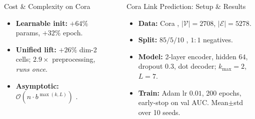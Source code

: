 \documentclass[final]{beamer}
\newlength{\sepwidth}
\newlength{\colwidth}
\newcommand{\separatorcolumn}{
  \begin{column}{\sepwidth}
\end{column}}
\begin{document}
\begin{frame}[t]
\begin{columns}[t]
\begin{column}{\colwidth}
\begin{block}{Cost \& Complexity on Cora}
        \medskip
        \raggedright
      \begin{itemize}\setlength{\itemsep}{0.12em}
          \item \textbf{Learnable init:} $+64\%$ params, $+32\%$ epoch.
          \item \textbf{Unified lift:} $+26\%$ dim-2 cells; $2.9{\times}$
            preprocessing, \emph{runs once}.
          \item \textbf{Asymptotic:}
            $\mathcal O(n\!\cdot\!b^{\max(k,L)})$
            \citep{truong_weisfeiler_2024}.
        \end{itemize}

      \end{block}

    \end{column}

    \separatorcolumn

    \begin{column}{\colwidth}

      \begin{block}{Cora Link Prediction: Setup \& Results}

      \begin{itemize}\setlength{\itemsep}{0.18em}
          \item \textbf{Data:} Cora \citep{sen_collective_2008}, $|\mathcal V|{=}2708$, $|\mathcal E|{=}5278$.
          \item \textbf{Split:} $85/5/10$ \citep{kipf_variational_2016}, $1{:}1$ negatives.
          \item \textbf{Model:} 2-layer encoder, hidden $64$, dropout $0.3$, dot decoder; $k_{\max}{=}2$, $L{=}7$.
          \item \textbf{Train:} Adam lr $0.01$, 200 epochs, early-stop on val AUC. Mean$\pm$std over 10 seeds.
        \end{itemize}


\end{block}
\end{column}
\end{columns}
\end{frame}
\end{document}
